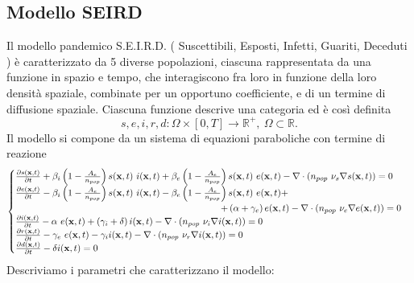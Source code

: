 \documentclass[11pt]{article}
\newcommand{\R}{\mathbb{R}}
\begin{document}
\subsection{Modello SEIRD}
Il modello pandemico S.E.I.R.D. ( Suscettibili, Esposti, Infetti, Guariti, Deceduti ) è caratterizzato da 5 diverse popolazioni, ciascuna rappresentata da una funzione in spazio e tempo, che interagiscono fra loro in funzione della loro densità spaziale, combinate per un opportuno coefficiente, e di un termine di diffusione spaziale. 
Ciascuna funzione descrive una categoria ed è così definita \[s,e,i,r,d: \Omega \times [0,T]  \rightarrow \R^+, \ \Omega \subset \R. \]
Il modello si compone da un sistema di equazioni paraboliche con termine di reazione  
\begin{equation*}
\begin{cases}
\frac{\partial s(\mathbf{x},t)}{\partial t}+ \beta_i \left(1-\frac{A_e}{n_{pop}} \right)s(\mathbf{x},t) \ i(\mathbf{x},t) + \beta_e \left(1-\frac{A_e}{n_{pop}} \right)s(\mathbf{x},t) \ e(\mathbf{x},t) - \nabla \cdot (n_{pop} \  \nu_s \nabla s(\mathbf{x},t))=0 \\

\frac{\partial e(\mathbf{x},t)}{\partial t} - \beta_i \left(1-\frac{A_e}{n_{pop}} \right)s(\mathbf{x},t) \ i(\mathbf{x},t) - \beta_e \left(1-\frac{A_e}{n_{pop}} \right)s(\mathbf{x},t) \ e(\mathbf{x},t) + \\ \hspace{7.75cm} + \left( \alpha + \gamma_e \right)e(\mathbf{x},t) - \nabla \cdot (n_{pop} \  \nu_e \nabla e(\mathbf{x},t))=0 \\

\frac{\partial i(\mathbf{x},t)}{\partial t} - \alpha \  e(\mathbf{x},t) + \left( \gamma_i + \delta \right) i(\mathbf{x},t) - \nabla \cdot \left( n_{pop} \ \nu_i \nabla i(\mathbf{x},t) \right) =0 \\

\frac{ \partial r(\mathbf{x},t)}{ \partial t} - \gamma_e \  e(\mathbf{x},t) - \gamma_i i(\mathbf{x},t) - \nabla \cdot \left(n_{pop} \ \nu_r \nabla i(\mathbf{x},t) \right) = 0 \\

\frac{ \partial d(\mathbf{x},t)}{ \partial t} - \delta i(\mathbf{x},t) =0 \\

\end{cases}
\end{equation*}
Descriviamo i parametri che caratterizzano il modello: 
\end{document}
